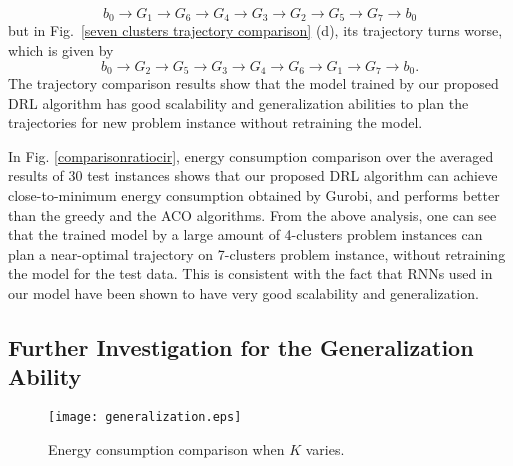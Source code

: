 \documentclass[journal]{IEEEtran}
\begin{document}
\begin{equation*}
    b_0 \rightarrow G_{1} \rightarrow G_{6}  \rightarrow G_{4} \rightarrow G_{3} \rightarrow G_{2} \rightarrow G_{5} \rightarrow G_{7} \rightarrow b_0
\end{equation*}
but in Fig.~\ref{seven clusters trajectory comparison} (d), its trajectory turns worse, which is given by
\begin{equation*}
    b_0 \rightarrow G_{2} \rightarrow G_{5}  \rightarrow G_{3} \rightarrow G_{4} \rightarrow G_{6} \rightarrow G_{1} \rightarrow G_{7} \rightarrow b_0.
\end{equation*}
The trajectory comparison results show that the model trained by our proposed DRL algorithm has good scalability and generalization abilities to plan the trajectories for new problem instance without retraining the model.



In Fig. \ref{comparisonratiocir}, energy consumption comparison over the averaged results of 30 test instances shows that our proposed DRL algorithm can achieve close-to-minimum energy consumption obtained by Gurobi, and performs better than the greedy and the ACO algorithms. {From the above analysis, one can see that the trained model by a large amount of 4-clusters problem instances can plan a near-optimal trajectory on 7-clusters problem instance, without retraining the model for the test data. This is consistent with the fact that RNNs used in our model have been shown to have very good scalability and generalization\cite{Z. Tu}.}



\subsection{Further Investigation for the Generalization Ability}

\begin{figure}[!t]
		\centering
		\texttt{[image: generalization.eps]}
		\caption{Energy consumption comparison when $K$ varies.}
		\label{ratio}
\end{figure}
\end{document}
